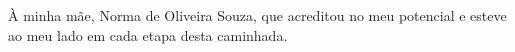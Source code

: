 À minha mãe, Norma de Oliveira Souza, que acreditou no meu potencial e esteve ao meu lado em cada etapa desta caminhada.
